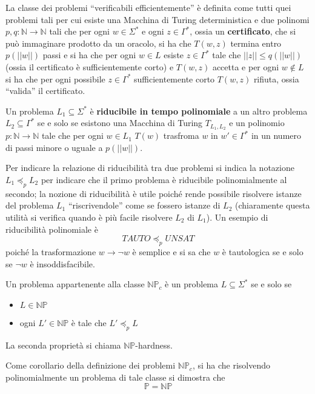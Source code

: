 \begin{defi}
  La classe dei problemi ``verificabili efficientemente'' è definita come 
  tutti quei problemi tali per cui esiste una Macchina di Turing deterministica 
  e due polinomi $p,q:\mathbb{N}\rightarrow \mathbb{N}$ tali che per ogni 
  $w \in \Sigma^*$ e ogni $z \in \Gamma^*$, ossia un \textbf{certificato}, 
  che si può immaginare prodotto da un oracolo, si ha 
  che $T(w,z)$ termina entro $p(||w||)$ passi e si ha che per ogni 
  $w \in L$ esiste $z \in \Gamma^*$ tale che $||z|| \leq q(||w||)$ (ossia 
  il certificato è sufficientemente corto) e $T(w,z)$ accetta e per ogni 
  $w \notin L$ si ha che per ogni possibile $z \in \Gamma^*$ sufficientemente corto
  $T(w,z)$ rifiuta, ossia ``valida'' il certificato.
\end{defi}

\begin{defi}[Riducibilità]
        Un problema $L_1 \subseteq \Sigma^*$ è \textbf{riducibile in tempo polinomiale} 
        a un altro problema $L_2 \subseteq \Gamma^*$ se e solo se esistono
        una Macchina di Turing $T_{{L_1}, {L_2}}$ e un polinomio
        $p: \mathbb{N} \rightarrow \mathbb{N}$ tale che per ogni $w \in L_1$
        $T(w)$ trasfroma $w$ in $w' \in \Gamma^*$ in un numero di passi 
        minore o uguale a $p(||w||)$. 
\end{defi}

Per indicare la relazione di riducibilità tra due problemi si indica la notazione 
$L_1 \preceq_p L_2$ per indicare che il primo problema è riducibile polinomialmente 
al secondo; la nozione di riducibilità è utile poiché rende possibile risolvere 
istanze del problema $L_1$ ``riscrivendole'' come se fossero istanze di $L_2$
(chiaramente questa utilità si verifica quando è più facile risolvere $L_2$ di 
$L_1$). 
Un esempio di riducibilità polinomiale è 
$$
TAUTO \preceq_p UNSAT
$$
poiché la trasformazione $w \rightarrow \neg w$ è semplice e si sa che 
$w$ è tautologica se e solo se $\neg w$ è insoddisfacibile.

\begin{defi}
        Un problema appartenente alla classe $\mathbb{NP}_c$ è un problema 
        $L \subseteq \Sigma^*$ se e solo se 
        \begin{itemize}
                \item $L \in \mathbb{NP}$
                \item ogni $L' \in \mathbb{NP}$ è tale che $L' \preceq_p L$ 
        \end{itemize}
        La seconda proprietà si chiama $\mathbb{NP}$-hardness. 
\end{defi}
Come corollario della definizione dei problemi $\mathbb{NP}_c$, si ha che risolvendo 
polinomialmente un problema di tale classe si dimostra che 
$$
\mathbb{P} = \mathbb{NP}
$$

